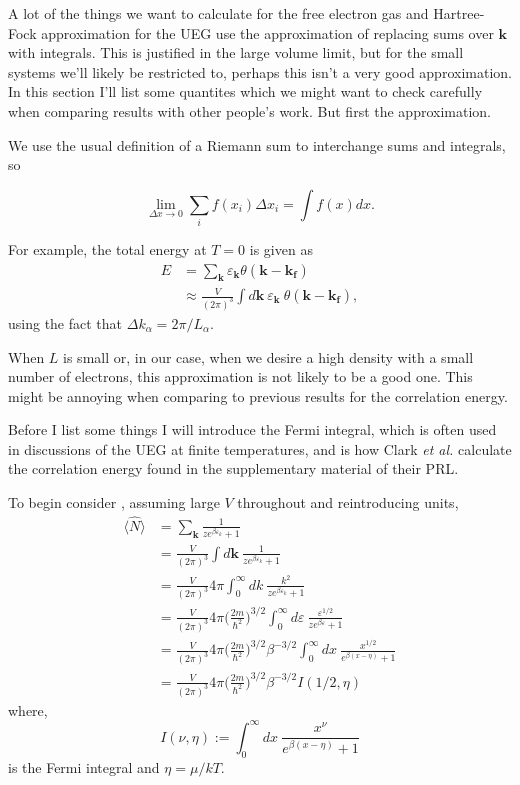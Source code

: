 \documentclass[11pt,twosided]{article}
\begin{document}
A lot of the things we want to calculate for the free electron gas and Hartree-Fock approximation for the UEG use the approximation of replacing sums over $\mathbf{k}$ with integrals.
This is justified in the large volume limit, but for the small systems we'll likely be restricted to, perhaps this isn't a very good approximation.
In this section I'll list some quantites which we might want to check carefully when comparing results with other people's work.
But first the approximation.

We use the usual definition of a Riemann sum to interchange sums and integrals, so

\begin{equation}
    \lim_{\Delta x \rightarrow 0} \sum_i f(x_i) \Delta x_i = \int f(x) dx.
\end{equation}

For example, the total energy at $T=0$ is given as
\begin{align}
    E &= \sum_{\mathbf{k}} \varepsilon_{\mathbf{k}} \theta(\mathbf{k}-\mathbf{k_f})\\
      &\approx \frac{V}{(2\pi)^3} \int d\mathbf{k} \ \varepsilon_{\mathbf{k}} \ \theta(\mathbf{k}-\mathbf{k_f}),
\end{align}
using the fact that $\Delta k_\alpha = 2\pi/L_\alpha$.

When $L$ is small or, in our case, when we desire a high density with a small number of electrons, this approximation is not likely to be a good one.
This might be annoying when comparing to previous results for the correlation energy.

Before I list some things I will introduce the Fermi integral, which is often used in discussions of the UEG at finite temperatures, and is how Clark \emph{et al.} calculate the correlation energy found in the supplementary material of their PRL.

To begin consider , assuming large $V$ throughout and reintroducing units,
\begin{align}
    \langle \hat{N} \rangle &= \sum_{\mathbf{k}}\frac{1}{ze^{ \beta\varepsilon_k} + 1}\\
                            &= \frac{V}{(2\pi)^3}\int d \mathbf{k} \ \frac{1}{ze^{ \beta\varepsilon_k} + 1}\\
                            &= \frac{V}{(2\pi)^3}4\pi\int_0^{\infty} dk \ \frac{k^2}{ze^{ \beta\varepsilon_k} + 1}\\
                            &= \frac{V}{(2\pi)^3}4\pi\Big(\frac{2m}{\hbar^2}\Big)^{3/2}\int_0^\infty d\varepsilon  \ \frac{\varepsilon^{1/2}}{ze^{ \beta\varepsilon} + 1}\\
                            &= \frac{V}{(2\pi)^3}4\pi\Big(\frac{2m}{\hbar^2}\Big)^{3/2}\beta^{-3/2}\int_0^\infty dx\ \frac{x^{1/2}}{e^{ \beta(x-\eta)} + 1}\\
                            &= \frac{V}{(2\pi)^3}4\pi\Big(\frac{2m}{\hbar^2}\Big)^{3/2}\beta^{-3/2} I(1/2,\eta)
\end{align}
where,
\begin{equation}
    I(\nu,\eta) := \int_0^\infty dx\ \frac{x^{\nu}}{e^{ \beta(x-\eta)} + 1}
\end{equation}
is the Fermi integral and $\eta = \mu/kT$.
\end{document}
